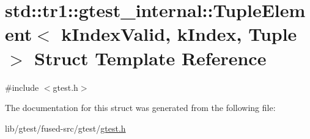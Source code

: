 \hypertarget{structstd_1_1tr1_1_1gtest__internal_1_1_tuple_element}{\section{std\-:\-:tr1\-:\-:gtest\-\_\-internal\-:\-:Tuple\-Element$<$ k\-Index\-Valid, k\-Index, Tuple $>$ Struct Template Reference}
\label{structstd_1_1tr1_1_1gtest__internal_1_1_tuple_element}
}


{\ttfamily \#include $<$gtest.\-h$>$}



The documentation for this struct was generated from the following file\-:\begin{DoxyCompactItemize}
\item 
lib/gtest/fused-\/src/gtest/\hyperlink{fused-src_2gtest_2gtest_8h}{gtest.\-h}\end{DoxyCompactItemize}
